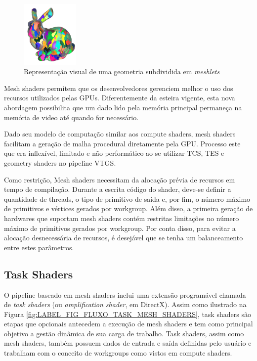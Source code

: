 \begin{figure}
  \centering
  \includegraphics[width=0.25\textwidth]{imagens/MeshletsBunnyNVidia.png}
  \caption{Representação visual de uma geometria subdividida em \textit{meshlets}}
  \label{fig:LABEL_FIG_MESHLETS}
\end{figure}

Mesh shaders permitem que os desenvolvedores gerenciem melhor o uso dos recursos utilizados pelas GPUs. Diferentemente da esteira vigente, esta nova abordagem possibilita que um dado lido pela memória principal permaneça na memória de video até quando for necessário.

Dado seu modelo de computação similar aos compute shaders, mesh shaders facilitam a geração de malha procedural diretamente pela GPU. Processo este que era inflexível, limitado e não performático ao se utilizar TCS, TES e geometry shaders no pipeline VTGS.

Como restrição, Mesh shaders necessitam da alocação prévia de recursos em tempo de compilação. Durante a escrita código do shader, deve-se definir a quantidade de threads, o tipo de primitivo de saída e, por fim, o número máximo de primitivos e vértices gerados por workgroup. Além disso, a primeira geração de hardwares que suportam mesh shaders contém restritas limitações no número máximo de primitivos gerados por workgroup. Por conta disso, para evitar a alocação desnecessária de recursos, é desejável que se tenha um balanceamento entre estes parâmetros.

\subsection{Task Shaders}\label{sec:LAVEL_CHP_1_SEC_TASK_SHADERS}

O pipeline baseado em mesh shaders inclui uma extensão programável chamada de \textit{task shaders} (ou \textit{amplification shader}, em DirectX). Assim como ilustrado na Figura \ref{fig:LABEL_FIG_FLUXO_TASK_MESH_SHADERS}, task shaders são etapas que opcionais antecedem a execução de mesh shaders e tem como principal objetivo a gestão dinâmica de sua carga de trabalho. Task shaders, assim como mesh shaders, também possuem dados de entrada e saída definidas pelo usuário e trabalham com o conceito de workgroups como vistos em compute shaders.

